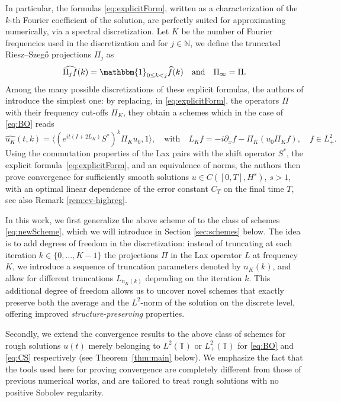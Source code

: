\documentclass [11pt] {article}
\newcommand{\<}{\langle}
\renewcommand{\>}{\rangle}
\newcommand{\wh}[1]{\widehat{#1}}
\begin{document}
In particular, the formulas \eqref{eq:explicitForm}, written as a characterization of the $k$-th Fourier coefficient of the solution, are perfectly suited for approximating numerically, via a spectral discretization. Let $K$ be the number of Fourier frequencies used in the discretization and for $j\in \mathbb{N}$, we define the truncated Riesz--Szeg\H{o} projections $\Pi_j$ as
\begin{equation*}
\wh{ \Pi_j f}(k) = \mathbbm{1}_{0\le k <j} \wh{f}(k) \quad\text{and}\quad \Pi_\infty = \Pi .
\end{equation*}
%
Among the many possible discretizations of these explicit formulas, the authors of \cite{ABCD24} introduce the simplest one: by replacing, in \eqref{eq:explicitForm}, the operators $\Pi$ with their frequency cut-offs $\Pi_{K}$, they obtain a schemes which in the case of \eqref{eq:BO} reads
\[
\widehat{u_K}(t,k)=\langle(e^{it(I+2L_{K})}S^{*})^k\Pi_K u_0,1\rangle, 
\quad \text{with}\quad
L_{K}f=-i\partial_xf-\Pi_K(u_0\Pi_Kf), \quad f \in L^{2}_{+}.
\]
Using the commutation properties of the Lax pairs with the shift operator $S^{*}$, the explicit formula~\eqref{eq:explicitForm}, and an equivalence of norms, the authors then
prove convergence for sufficiently smooth solutions $u \in C([0,T], H^s)$, $s>1$, with an optimal linear dependence of the error constant $C_T$ on the final time \( T \), see also Remark \ref{rem:cv-highreg}.

In this work, we first generalize the above scheme of \cite{ABCD24} to the class of schemes \eqref{eq:newScheme}, which we will introduce in Section \ref{sec:schemes} below. 
The idea is to add degrees of freedom in the discretization: instead of truncating at each iteration $k \in \{0,...,K-1 \}$ the projections $\Pi$ in the Lax operator $L$ at frequency $K$, we introduce a sequence of truncation parameters denoted by $n_K(k)$, and allow for different truncations $L_{n_K(k)}$ depending on the iteration $k$. This additional degree of freedom allows us to uncover novel schemes that exactly preserve both the average and the $L^2$-norm of the solution on the discrete level, offering improved {\it structure-preserving} properties.

Secondly, we extend the convergence results to the above class of schemes for rough solutions $u(t)$ merely belonging to $L^2(\mathbb{T})$ or $L^2_{+}(\mathbb{T})$ for \eqref{eq:BO} and \eqref{eq:CS} respectively  (see Theorem~\ref{thm:main} below). We emphasize the fact that the tools used here for proving convergence are completely different from those of previous numerical works, and are tailored to treat rough solutions with no positive Sobolev regularity.
\end{document}
